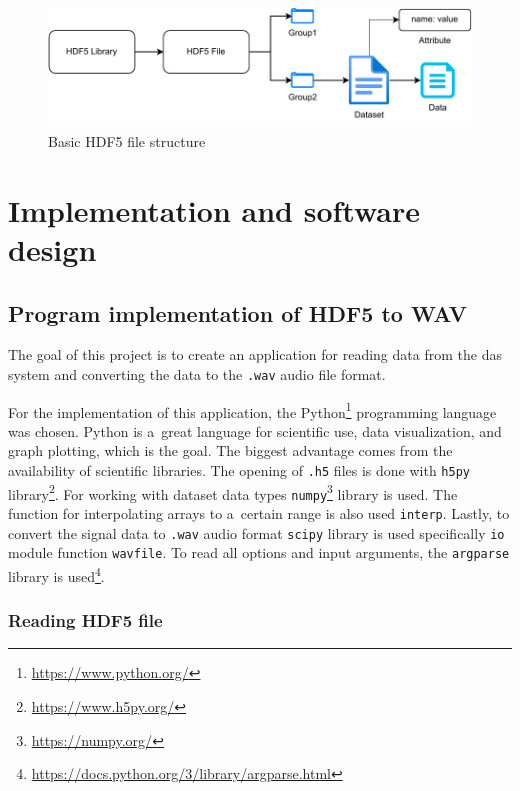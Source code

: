 \begin{figure}
    \centering
    \includegraphics[width=\linewidth]{pdf/hdf5_file_structure.pdf}
    \caption{Basic HDF5 file structure}
    \label{fig:filestructure}
\end{figure}

\newpage %

\chapter{Implementation and software design}

\section{Program implementation of HDF5 to WAV}\label{lab:hdftowav}

The goal of this project is to create an application for reading data from the \ac{das} system and converting the data to the \verb|.wav| audio file format.

For the implementation of this application, the Python\footnote{\url{https://www.python.org/}} programming language was chosen. Python is a~great language for scientific use, data visualization, and graph plotting, which is the goal. The biggest advantage comes from the availability of scientific libraries. The opening of \verb |.h5| files is done with \verb|h5py| library\footnote{\url{https://www.h5py.org/}}. For working with dataset data types \verb|numpy|\footnote{\url{https://numpy.org/}} library is used. The function for interpolating arrays to a~certain range is also used \verb|interp|. Lastly, to convert the signal data to \verb|.wav| audio format \verb|scipy| library is used specifically \verb|io| module function \verb|wavfile|. To read all options and input arguments, the \verb|argparse| library is used\footnote{\url{https://docs.python.org/3/library/argparse.html}}.   

\subsection{Reading HDF5 file}\label{sec:readhdf}

